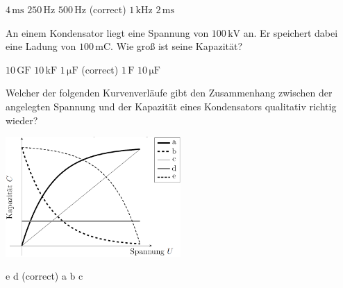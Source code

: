 \documentclass[11pt]{exam}
\begin{document}
\begin{questions}
\begin{choices}
	\choice \(\mathrm{4\,ms}\)
	\choice \(\mathrm{250\,Hz}\)
	\choice \(\mathrm{500\,Hz}\) (correct)
	\choice \(\mathrm{1\,kHz}\)
	\choice \(\mathrm{2\,ms}\)
\end{choices}

\vspace{3mm}\question An einem Kondensator liegt eine Spannung von \(\mathrm{100\,kV}\) an. Er speichert dabei eine Ladung von \(\mathrm{100\,mC}\). Wie groß ist seine Kapazität?

\begin{choices}
	\choice \(\mathrm{10\,GF}\)
	\choice \(\mathrm{10\,kF}\)
	\choice \(\mathrm{1\,\mu F}\) (correct)
	\choice \(\mathrm{1\,F}\)
	\choice \(\mathrm{10\,\mu F}\)
\end{choices}

\vspace{3mm}\question Welcher der folgenden Kurvenverläufe gibt den Zusammenhang zwischen der angelegten Spannung und der Kapazität eines Kondensators qualitativ richtig wieder? 

\includegraphics[width=0.5\textwidth]{../../../questions/D/images/Kondensator-C-U.png}

\begin{choices}
	\choice e
	\choice d (correct)
	\choice a
	\choice b
	\choice c
\end{choices}

\vspace{3mm}\end{questions}
\end{document}
